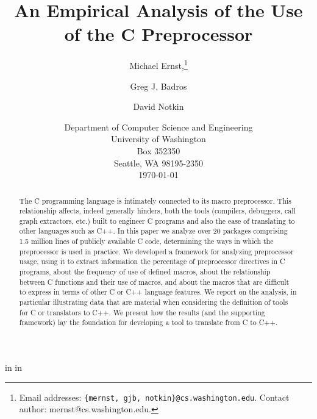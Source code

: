 
\marginparwidth 0pt
\oddsidemargin  0pt
\evensidemargin 0pt
\marginparsep 0pt

\topmargin   0pt

 in
 in




\title{An Empirical Analysis of the Use of the C Preprocessor}

\author{Michael Ernst,\thanks{Email 
addresses: {\tt \{mernst, gjb, notkin\}@cs.washington.edu}.  Contact author:
mernst@cs.washington.edu.}
\and Greg J. Badros \and David Notkin}


\date{Department of Computer
Science and Engineering\\
University of Washington\\
Box 352350\\
Seattle, WA  98195-2350\\
\today}  

\maketitle


\begin{abstract}

The C programming language is intimately connected to its macro
preprocessor.  This relationship affects, indeed generally hinders,
both the tools (compilers, debuggers, call graph extractors, etc.)
built to engineer C programs and also the ease of translating to other
languages such as C++.  In this paper we analyze over 20 packages
comprising 1.5 million lines of publicly available C code, determining
the ways in which the preprocessor is used in practice.  We developed
a framework for analyzing preprocessor usage, using it to extract
information the percentage of preprocessor directives in C programs,
about the frequency of use of defined macros, about the relationship
between C functions and their use of macros, and about the macros that
are difficult to express in terms of other C or C++ language features.
We report on the analysis, in particular illustrating data that are
material when considering the definition of tools for C or translators
to C++.  We present how the results (and the supporting framework) lay
the foundation for developing a tool to translate from C to C++.

\end{abstract}

